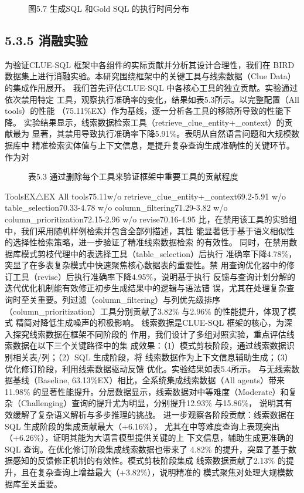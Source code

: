 \documentclass[12pt,a4paper,openright,UTF8]{ctexbook}
\begin{document}
\begin{figure}[htbp]
\centering
{}
\caption{图5.7 生成SQL 和Gold SQL 的执行时间分布}
\end{figure}

\subsection{5.3.5 消融实验}

为验证CLUE-SQL 框架中各组件的实际贡献并分析其设计合理性，我们在 BIRD 数据集上进行消融实验。本研究围绕框架中的关键工具与线索数据（Clue Data）的集成作用展开。 我们首先评估CLUE-SQL 中各核心工具的独立贡献。实验通过依次禁用特定 工具，观察执行准确率的变化，结果如表5.3所示。以完整配置（All tools）的性能 （75.11\%EX）作为基线，逐一分析各工具的移除所导致的性能下降。 实验结果显示，线索数据检索工具（retrieve\_clue\_entity+\_context）的贡献最为 显著，其禁用导致执行准确率下降5.91\%。表明从自然语言问题和大规模数据库中 精准检索实体值与上下文信息，是提升复杂查询生成准确性的关键环节。作为对

\begin{figure}[htbp]
\centering
{}
\caption{表5.3 通过删除每个工具来验证框架中重要工具的贡献程度}
\end{figure}

ToolsEX$\triangle$EX All tools75.11w/o retrieve\_clue\_entity+\_context69.2-5.91 w/o table\_selection70.33-4.78 w/o column\_filtering71.29-3.82 w/o column\_prioritization72.15-2.96 w/o revise70.16-4.95 比，在禁用该工具的实验组中，我们采用随机样例检索并包含全部列描述，其性 能显著低于基于语义相似性的选择性检索策略，进一步验证了精准线索数据检索 的有效性。 同时，在禁用数据库模式剪枝代理中的表选择工具（table\_selection）后执行 准确率下降4.78\%，突显了在多表复杂模式中快速聚焦核心数据表的重要性。禁 用查询优化器中的修订工具（revise）后执行准确率下降4.95\%，说明基于执行 反馈与查询计划分解的迭代优化机制能有效修正初步生成结果中的逻辑与语法错 误，尤其在处理复杂查询时至关重要。列过滤（column\_filtering）与列优先级排序 （column\_prioritization）工具分别贡献了3.82\% 与2.96\% 的性能提升，体现了模式 精简对降低生成噪声的积极影响。 线索数据是CLUE-SQL 框架的核心，为深入探究线索数据在框架不同阶段的 作用，我们设计了多组对照实验，重点评估线索数据在以下三个关键路径中的集 成效果：（1）模式剪枝阶段，通过线索数据识别相关表/列；（2）SQL 生成阶段，将 线索数据作为上下文信息辅助生成；（3）优化修订阶段，利用线索数据驱动反馈 优化。实验结果如表5.4所示。 与无线索数据基线（Baseline, 63.13\%EX）相比，全系统集成线索数据（All agents）带来11.98\% 的显著性能提升。分层数据显示，线索数据对中等难度（Moderate）和复杂（Challenging）查询的提升尤为明显，分别提升12.93\% 与15.86\%， 说明其有效缓解了复杂语义解析与多步推理的挑战。 进一步观察各阶段贡献：线索数据在SQL 生成阶段的集成贡献最大（+6.16\%）， 尤其在中等难度查询上表现突出（+6.26\%），证明其能为大语言模型提供关键的上 下文信息，辅助生成更准确的SQL 查询。在优化修订阶段集成线索数据也带来了 4.82\% 的提升，突显了基于数据感知的反馈修正机制的有效性。模式剪枝阶段集成 线索数据贡献了2.13\% 的提升，且在复杂查询上增益最大（+3.82\%），说明精准的 模式聚焦对处理大规模数据库至关重要。
\end{document}
